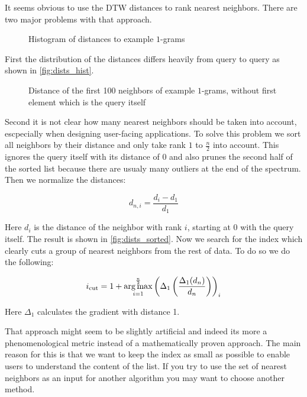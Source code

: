 It seems obvious to use the DTW distances to rank nearest neighbors. There are two major problems with that approach.

\begin{figure}
    \centering
    
    \caption{Histogram of distances to example $1$-grams}
    \label{fig:dists_hist}
\end{figure}

First the distribution of the distances differs heavily from query to query as shown in \autoref{fig:dists_hist}.

\begin{figure}
    \centering
    
    \caption{Distance of the first \num{100} neighbors of example $1$-grams, without first element which is the query itself}
    \label{fig:dists_sorted}
\end{figure}

Second it is not clear how many nearest neighbors should be taken into account, escpecially when designing user-facing applications. To solve this problem we sort all neighbors by their distance and only take rank $1$ to $\frac{n}{2}$ into account. This ignores the query itself with its distance of \num{0} and also prunes the second half of the sorted list because there are usualy many outliers at the end of the spectrum. Then we normalize the distances:

\begin{equation}\label{eq:dists_norm}
    d_{n,i} = \frac{d_i - d_1}{d_1}
\end{equation}

Here $d_i$ is the distance of the neighbor with rank $i$, starting at \num{0} with the query itself. The result is shown in \autoref{fig:dists_sorted}. Now we search for the index which clearly cuts a group of nearest neighbors from the rest of data. To do so we do the following:

\begin{equation}\label{eq:dists_cut}
    i_\text{cut} = 1 + \operatorname*{arg\,max}_{i=1}^\frac{n}{2} \left( \Delta_1 \left( \frac{\Delta_1(d_n)}{d_n} \right) \right)_i
\end{equation}

Here $\Delta_1$ calculates the gradient with distance \num{1}.

That approach might seem to be slightly artificial and indeed its more a phenomenological metric instead of a mathematically proven approach. The main reason for this is that we want to keep the index as small as possible to enable users to understand the content of the list. If you try to use the set of nearest neighbors as an input for another algorithm you may want to choose another method.

